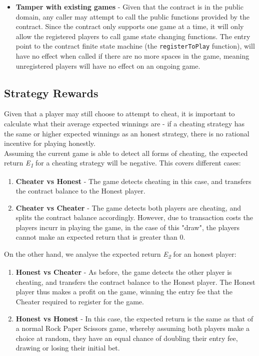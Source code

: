 \documentclass[a4paper, twoside]{article}
\begin{document}
\begin{itemize}
	\item \textbf{Tamper with existing games} - Given that the contract is in the public domain, any caller may attempt to call the public functions provided by the contract. Since the contract only supports one game at a time, it will only allow the registered players to call game state changing functions. The entry point to the contract finite state machine (the \texttt{registerToPlay} function), will have no effect when called if there are no more spaces in the game, meaning unregistered players will have no effect on an ongoing game.
\end{itemize}

\subsection{Strategy Rewards}

Given that a player may still choose to attempt to cheat, it is important to calculate what their average expected winnings are - if a cheating strategy has the same or higher expected winnings as an honest strategy, there is no rational incentive for playing honestly. \\

Assuming the current game is able to detect all forms of cheating, the expected return \textit{E\textsubscript{1}} for a cheating strategy will be negative. This covers different cases:

\begin{enumerate}
	\item \textbf{Cheater vs Honest} - The game detects cheating in this case, and transfers the contract balance to the Honest player.
	\item \textbf{Cheater vs Cheater} - The game detects both players are cheating, and splits the contract balance accordingly. However, due to transaction costs the players incurr in playing the game, in the case of this "draw", the players cannot make an expected return that is greater than 0.
\end{enumerate} 

On the other hand, we analyse the expected return \textit{E\textsubscript{2}} for an honest player:

\begin{enumerate}
	\item \textbf{Honest vs Cheater} - As before, the game detects the other player is cheating, and transfers the contract balance to the Honest player. The Honest player thus makes a profit on the game, winning the entry fee that the Cheater required to register for the game.
	\item \textbf{Honest vs Honest} - In this case, the expected return is the same as that of a normal Rock Paper Scissors game, whereby assuming both players make a choice at random, they have an equal chance of doubling their entry fee, drawing or losing their initial bet.
\end{enumerate}
\end{document}
